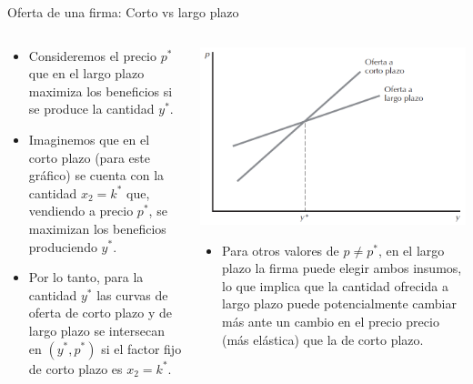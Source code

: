 \documentclass{beamer}
\theoremstyle{definition}
\begin{document}
\begin{frame}{Oferta de una firma: Corto vs largo plazo}
\small
\begin{columns}
\begin{column}[t]{0.46\textwidth}
\begin{itemize}[leftmargin=*]
\item Consideremos el precio $p^*$ que en el largo plazo maximiza los beneficios si se produce la cantidad $y^*$.

\item Imaginemos que en el corto plazo (para este gráfico) se cuenta con la cantidad $x_2=k^*$ que, vendiendo a precio $p^*$, se maximizan los beneficios produciendo $y^*$.

\item Por lo tanto, para la cantidad $y^*$ las curvas de oferta de corto plazo y de largo plazo se intersecan en $(y^*,p^*)$ si el factor fijo de corto plazo es $x_2=k^*$.
\end{itemize}
\end{column}
 \begin{column}[t]{0.52\textwidth}
    \begin{center}
\includegraphics[scale=0.4]{figures4/LP.png}
\begin{itemize}[leftmargin=*]
    \item 
Para otros valores de $p\neq p^*$, en el largo plazo la firma puede elegir ambos insumos, lo que implica que la cantidad ofrecida a largo plazo puede potencialmente cambiar más ante un cambio en el precio precio (más elástica) que la de corto plazo. %
\end{itemize}
\end{center}
    \end{column}
\end{columns}
\end{frame}
\end{document}
